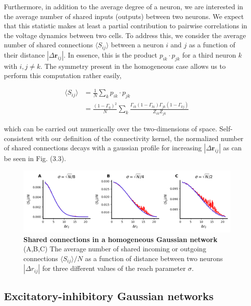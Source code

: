 \documentclass{ucetd}
\begin{document}
Furthermore, in addition to the average degree of a neuron, we are interested in the average number of shared inputs (outputs) between two neurons. We expect that this statistic makes at least a partial contribution to pairwise correlations in the voltage dynamics between two cells. To address this, we consider the average number of shared connections $\langle S_{ij} \rangle$ between a neuron $i$ and $j$ as a function of their distance $|\Delta \mathbf{r}_{ij}|$. In essence, this is the product $p_{ik}\cdot p_{jk}$ for a third neuron $k$ with $i,j\neq k$. The symmetry present in the homogeneous case allows us to perform this computation rather easily,

\begin{align}
\langle S_{ij} \rangle &= \frac{1}{N}\sum_{k} p_{ik}\cdot p_{jk} \\
&= \frac{\left(1-\Gamma_{0}\right)^{2}}{N}\sum_{k}\frac{\Gamma_{ik}(1-\Gamma_{ki})\Gamma_{jk}(1-\Gamma_{kj})}{Z_{ik}Z_{jk}}
\end{align}


which can be carried out numerically over the two-dimensions of space. Self-consistent with our definition of the connectivity kernel, the normalized number of shared connections decays with a gaussian profile for increasing $|\Delta \mathbf{r}_{ij}|$ as can be seen in Fig. (3.3).

\begin{figure}
\centering
\includegraphics[width=175mm]{fig_9}
\caption{\textbf{Shared connections in a homogeneous Gaussian network} (A,B,C) The average number of shared incoming or outgoing connections $\langle S_{ij}\rangle /N$ as a function of distance between two neurons $|\Delta r_{ij}|$ for three different values of the reach parameter $\sigma$.}
\end{figure}



\subsection{Excitatory-inhibitory Gaussian networks}
\end{document}
